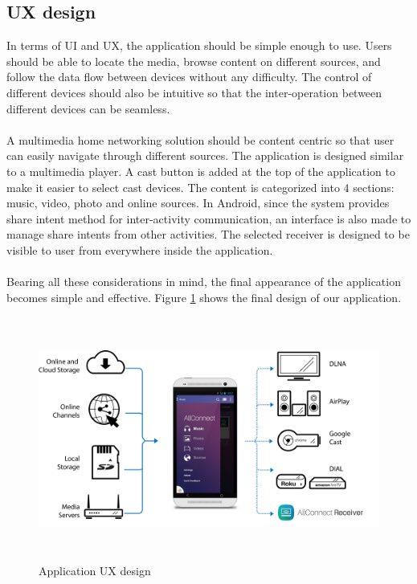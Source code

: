 \subsection{UX design}
In terms of UI and UX, the application should be simple enough to use. Users should be able to locate the media, browse
 content on different sources, and follow the data flow between devices without any difficulty. The control of different devices should also be intuitive so that the inter-operation between different devices can be seamless.\\
\\
A multimedia home networking solution should be content centric so that user can easily navigate through different sources. The application is designed similar to a multimedia player. A cast button is added at the top of the application to make it easier to select cast devices. The content is categorized into 4 sections: music, video, photo and online sources. In Android, since the system provides share intent method for inter-activity communication, an interface is also made to manage share intents from other activities. The selected receiver is designed to be visible to user from everywhere inside the application. \\
\\
Bearing all these considerations in mind, the final appearance of the application becomes simple and effective. Figure \ref{chart5} shows the final design of our application.
\begin{figure}[htb]
\centering \includegraphics[height=8cm]{charts/allconnect-app}
\caption{Application UX design \label{chart5}}
\end{figure}

